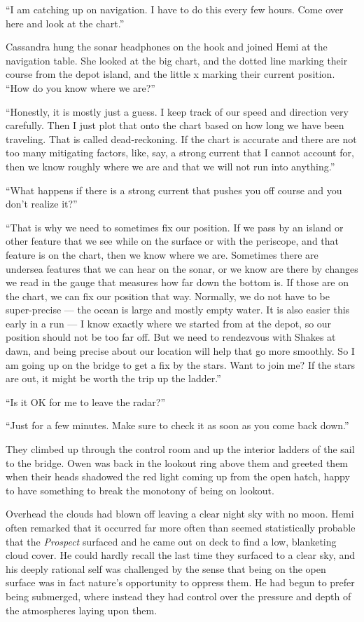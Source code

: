 \documentclass[
]{scrbook}
\begin{document}
``I am catching up on navigation. I have to do this every few hours.
Come over here and look at the chart.''

Cassandra hung the sonar headphones on the hook and joined Hemi at the
navigation table. She looked at the big chart, and the dotted line
marking their course from the depot island, and the little x marking
their current position. ``How do you know where we are?''

``Honestly, it is mostly just a guess. I keep track of our speed and
direction very carefully. Then I just plot that onto the chart based on
how long we have been traveling. That is called dead-reckoning. If the
chart is accurate and there are not too many mitigating factors, like,
say, a strong current that I cannot account for, then we know roughly
where we are and that we will not run into anything.''

``What happens if there is a strong current that pushes you off course
and you don't realize it?''

``That is why we need to sometimes fix our position. If we pass by an
island or other feature that we see while on the surface or with the
periscope, and that feature is on the chart, then we know where we are.
Sometimes there are undersea features that we can hear on the sonar, or
we know are there by changes we read in the gauge that measures how far
down the bottom is. If those are on the chart, we can fix our position
that way. Normally, we do not have to be super-precise --- the ocean is
large and mostly empty water. It is also easier this early in a run ---
I know exactly where we started from at the depot, so our position
should not be too far off. But we need to rendezvous with Shakes at
dawn, and being precise about our location will help that go more
smoothly. So I am going up on the bridge to get a fix by the stars. Want
to join me? If the stars are out, it might be worth the trip up the
ladder.''

``Is it OK for me to leave the radar?''

``Just for a few minutes. Make sure to check it as soon as you come back
down.''

They climbed up through the control room and up the interior ladders of
the sail to the bridge. Owen was back in the lookout ring above them and
greeted them when their heads shadowed the red light coming up from the
open hatch, happy to have something to break the monotony of being on
lookout.

Overhead the clouds had blown off leaving a clear night sky with no
moon. Hemi often remarked that it occurred far more often than seemed
statistically probable that the \emph{Prospect} surfaced and he came out
on deck to find a low, blanketing cloud cover. He could hardly recall
the last time they surfaced to a clear sky, and his deeply rational self
was challenged by the sense that being on the open surface was in fact
nature's opportunity to oppress them. He had begun to prefer being
submerged, where instead they had control over the pressure and depth of
the atmospheres laying upon them.
\end{document}
